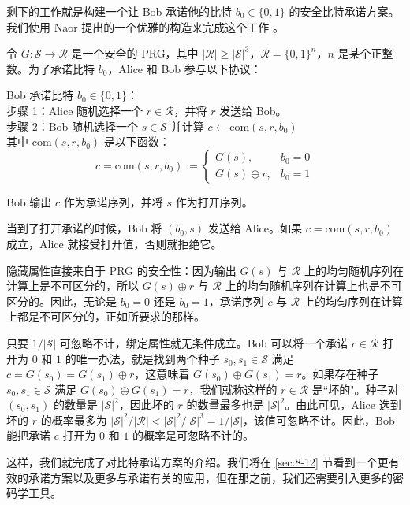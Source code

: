 \begin{snote}[来自安全PRG的比特承诺。]
剩下的工作就是构建一个让 Bob 承诺他的比特 $b_0\in\{0,1\}$ 的安全比特承诺方案。我们使用 Naor 提出的一个优雅的构造来完成这个工作 \cite{naor1989bit}。

令 $G:\mathcal{S}\to\mathcal{R}$ 是一个安全的 PRG，其中 $|\mathcal{R}|\geq|\mathcal{S}|^3$，$\mathcal{R}=\{0,1\}^n$，$n$ 是某个正整数。为了承诺比特 $b_0$，Alice 和 Bob 参与以下协议：

\vspace*{5pt}

\hspace*{5pt} Bob 承诺比特 $b_0\in\{0,1\}$：\\
\hspace*{50pt} 步骤 1：Alice 随机选择一个 $r\in\mathcal{R}$，并将 $r$ 发送给 Bob。\\
\hspace*{50pt} 步骤 2：Bob 随机选择一个 $s\in\mathcal{S}$ 并计算 $c\leftarrow\mathrm{com}(s,r,b_0)$\\
\hspace*{90pt} 其中 $\mathrm{com}(s,r,b_0)$ 是以下函数：\\
\[
c=\mathrm{com}(s,r,b_0):=
\left\{
\begin{array}{ll}
G(s), & b_0=0\\
G(s)\oplus r, & b_0=1
\end{array}	
\right.
\]

\hspace*{5pt} Bob 输出 $c$ 作为承诺序列，并将 $s$ 作为打开序列。

\vspace*{5pt}

\noindent
当到了打开承诺的时候，Bob 将 $(b_0,s)$ 发送给 Alice。如果 $c=\mathrm{com}(s,r,b_0)$ 成立，Alice 就接受打开值，否则就拒绝它。

隐藏属性直接来自于 PRG 的安全性：因为输出 $G(s)$ 与 $\mathcal{R}$ 上的均匀随机序列在计算上是不可区分的，所以 $G(s)\oplus r$ 与 $\mathcal{R}$ 上的均匀随机序列在计算上也是不可区分的。因此，无论是 $b_0=0$ 还是 $b_0=1$，承诺序列 $c$ 与 $\mathcal{R}$ 上的均匀序列在计算上都是不可区分的，正如所要求的那样。

只要 $1/|\mathcal{S}|$ 可忽略不计，绑定属性就无条件成立。Bob 可以将一个承诺 $c\in\mathcal{R}$ 打开为 $0$ 和 $1$ 的唯一办法，就是找到两个种子 $s_0,s_1\in\mathcal{S}$ 满足 $c=G(s_0)=G(s_1)\oplus r$，这意味着 $G(s_0)\oplus G(s_1)=r$。如果存在种子 $s_0,s_1\in\mathcal{S}$ 满足 $G(s_0)\oplus G(s_1)=r$，我们就称这样的 $r\in\mathcal{R}$ 是``坏的"。种子对 $(s_0,s_1)$ 的数量是 $|\mathcal{S}|^2$，因此坏的 $r$ 的数量最多也是 $|\mathcal{S}|^2$。由此可见，Alice 选到坏的 $r$ 的概率最多为 $|\mathcal{S}|^2/|\mathcal{R}| < |\mathcal{S}|^2/|\mathcal{S}|^3 = 1/|\mathcal{S}|$，该值可忽略不计。因此，Bob 能把承诺 $c$ 打开为 $0$ 和 $1$ 的概率是可忽略不计的。
\end{snote}

这样，我们就完成了对比特承诺方案的介绍。我们将在 \ref{sec:8-12} 节看到一个更有效的承诺方案以及更多与承诺有关的应用，但在那之前，我们还需要引入更多的密码学工具。
